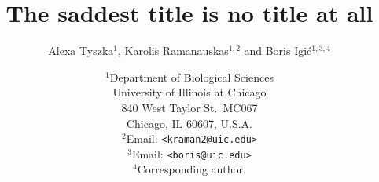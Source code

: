 \documentclass[11pt,letterpaper,titlepage]{article}
\begin{document}
\title{\Large\bf{The saddest title is no title at all}}
\author{Alexa Tyszka$^{1}$, Karolis Ramanauskas$^{1,2}$ and Boris Igi\'{c}$^{1,3,4}$}
\date{
    $^1$Department of Biological Sciences\\
    University of Illinois at Chicago\\
    840 West Taylor St.\ MC067\\
    Chicago, IL 60607, U.S.A.\\
    [\baselineskip]
    $^2$Email: {\tt<kraman2@uic.edu>}\\
    $^3$Email: {\tt<boris@uic.edu>}\\
    $^4$Corresponding author.\\
}
\maketitle

\end{document}
